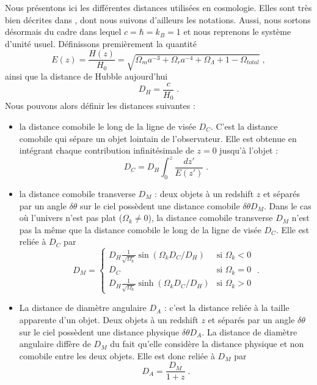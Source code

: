 Nous présentons ici les différentes distances utilisées en cosmologie. Elles sont très bien décrites dans \textcite{Hogg1999}, dont nous suivons d'ailleurs les notations. Aussi, nous sortons désormais du cadre dans lequel $c = \hbar = k_{B} = 1$ et nous reprenons le système d'unité usuel. Définissons premièrement la quantité
\begin{equation}
  \label{eq:dist_ez}
  E(z) = \frac{H(z)}{H_0} 
  = \sqrt{\Omega_m a^{-3} + \Omega_r a^{-4} + \Omega_{\Lambda} + 1 - \Omega_{total}}  \; ,
\end{equation}
ainsi que la distance de Hubble aujourd'hui
\begin{equation}
  \label{eq:dist_hubble}
  D_H = \frac{c}{H_0}  \; .
\end{equation}
Nous pouvons alors définir les distances suivantes :
\begin{itemize}[label=$\bullet$]
\item la distance comobile le long de la ligne de visée $D_{C}$. C'est la distance comobile qui sépare un objet lointain de l'observateur. Elle est obtenue en intégrant chaque contribution infinitésimale de $z=0$ jusqu'à l'objet :
  \begin{equation}
    \label{eq:dist_como}
    D_{C} = D_H \int_0^z \frac{dz'}{E(z')}  \; .
  \end{equation}
\item la distance comobile transverse $D_M$ : deux objets à un redshift $z$ et séparés par un angle $\delta \theta$ sur le ciel possèdent une distance comobile $\delta \theta D_M$.
  Dans le cas où l'univers n'est pas plat ($\Omega_k \neq 0$), la distance comobile transverse $D_M$  n'est pas la même que la distance comobile le long de la ligne de visée $D_{C}$. Elle est reliée à $D_{C}$ par
  \begin{equation}
    \label{eq:dist_como_trans}
    D_M = \left\{
      \begin{array}{ll}
        D_H \frac{1}{\sqrt{\Omega_k}} \sin(\Omega_k D_C / D_H) & \mbox{si } \Omega_k < 0 \\
        D_C & \textrm{si } \Omega_k = 0 \\
        D_H \frac{1}{\sqrt{\Omega_k}} \sinh(\Omega_k D_C / D_H) & \mbox{si } \Omega_k > 0
      \end{array}
    \right. \; .
  \end{equation}
 
\item La distance de diamètre angulaire $D_A$ : c'est la distance reliée à la taille apparente d'un objet. Deux objets à un redshift $z$ et séparés par un angle $\delta \theta$ sur le ciel possèdent une distance physique $\delta \theta D_A$. La distance de diamètre angulaire diffère de $D_M$ du fait qu'elle considère la distance physique et non comobile entre les deux objets. Elle est donc reliée à $D_M$ par
  \begin{equation}
    \label{eq:dist_ang}
    D_A = \frac{D_M}{1+z}  \; .
  \end{equation}


\end{itemize}
